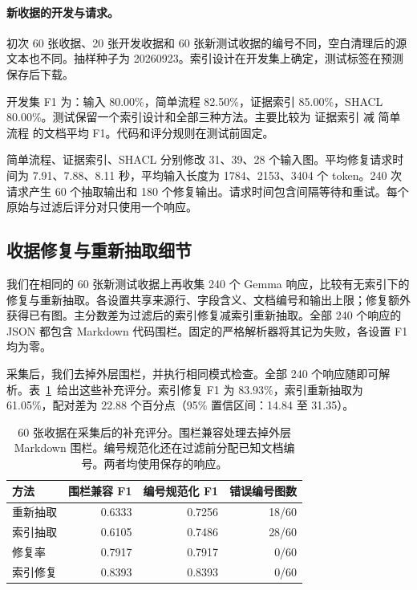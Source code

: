 \paragraph{新收据的开发与请求。}
\label{app:receipt_development}

初次 60 张收据、20 张开发收据和 60 张新测试收据的编号不同，空白清理后的源文本也不同。抽样种子为 20260923。索引设计在开发集上确定，测试标签在预测保存后下载。

开发集 F1 为：输入 80.00\%，简单流程 82.50\%，证据索引 85.00\%，SHACL 80.00\%。测试保留一个索引设计和全部三种方法。主要比较为 证据索引 减 简单流程 的文档平均 F1。代码和评分规则在测试前固定。

简单流程、证据索引、SHACL 分别修改 31、39、28 个输入图。平均修复请求时间为 7.91、7.88、8.11 秒，平均输入长度为 1784、2153、3404 个 token。240 次请求产生 60 个抽取输出和 180 个修复输出。请求时间包含间隔等待和重试。每个原始与过滤后评分对只使用一个响应。

\subsection{收据修复与重新抽取细节}
\label{app:reextraction_diagnostics}

我们在相同的 60 张新测试收据上再收集 240 个 Gemma 响应，比较有无索引下的修复与重新抽取。各设置共享来源行、字段含义、文档编号和输出上限；修复额外获得已有图。主分数差为过滤后的索引修复减索引重新抽取。全部 240 个响应的 JSON 都包含 Markdown 代码围栏。固定的严格解析器将其记为失败，各设置 F1 均为零。

采集后，我们去掉外层围栏，并执行相同模式检查。全部 240 个响应随即可解析。表~\ref{tab:reextraction_recovery}~给出这些补充评分。索引修复 F1 为 83.93\%，索引重新抽取为 61.05\%，配对差为 22.88 个百分点（95\% 置信区间：14.84 至 31.35）。

\begin{table}[t]
\centering
\caption{60 张收据在采集后的补充评分。围栏兼容处理去掉外层 Markdown 围栏。编号规范化还在过滤前分配已知文档编号。两者均使用保存的响应。}
\label{tab:reextraction_recovery}
\small
\begin{tabular}{lrrr}
\toprule
方法 & 围栏兼容 F1 & 编号规范化 F1 & 错误编号图数 \\
\midrule
重新抽取 & 0.6333 & 0.7256 & 18/60 \\
索引抽取 & 0.6105 & 0.7486 & 28/60 \\
修复率 & 0.7917 & 0.7917 & 0/60 \\
索引修复 & 0.8393 & 0.8393 & 0/60 \\
\bottomrule
\end{tabular}
\end{table}

